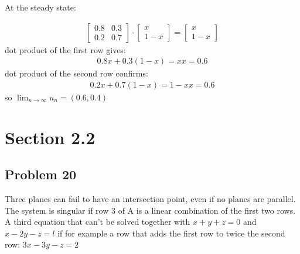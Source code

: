 \documentclass[a4paper,11pt]{article}
\begin{document}
At the steady state:

\begin{align}
\begin{bmatrix}
0.8 & 0.3\\
0.2 & 0.7
\end{bmatrix}
\cdot
\begin{bmatrix}
x  \\
1-x 
\end{bmatrix}
=
\begin{bmatrix}
x  \\
1-x 
\end{bmatrix}
\end{align}
dot product of the first row gives:
\begin{align}
0.8x+0.3(1-x)=x
x=0.6
\end{align}
dot product of the second row confirms:
\begin{align}
0.2x+0.7(1-x)=1-x
x=0.6
\end{align}
so $\lim_{n \to \infty} u_n = (0.6,0.4)$

\section*{Section 2.2}
\subsection*{Problem 20}
Three planes can fail to have an intersection point, even if no planes are parallel.
The system is singular if row 3 of A is a linear combination of the first two rows. A third
equation that can't be solved together with $x + y + z = 0$ and $x - 2y - z = l$ if for example a row that adds the first row to twice the second row: $3x - 3y - z = 2$
\end{document}
